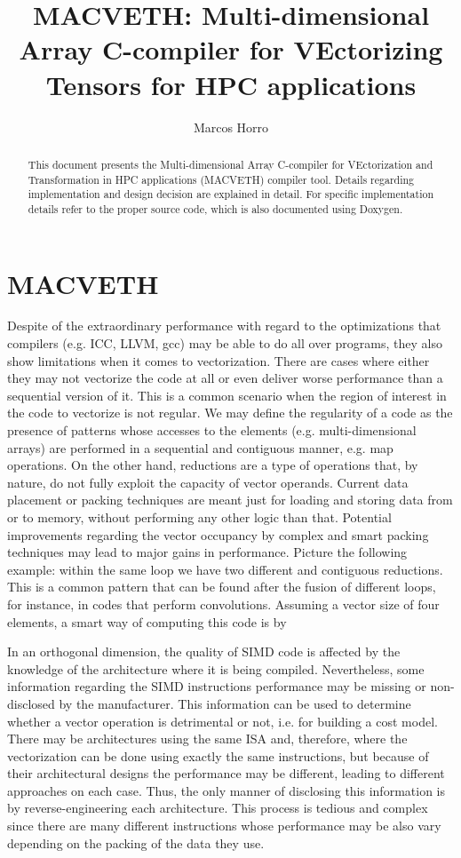 \documentclass[a4paper,12pt]{memoir}
\title{\textbf{MACVETH}: \textbf{M}ulti-dimensional \textbf{A}rray
    \textbf{C}-compiler for \textbf{VE}ctorizing
    \textbf{T}ensors for \textbf{H}PC applications}
\author{Marcos Horro}
\date{}
\begin{document}
\maketitle

\begin{abstract}
	This document presents the Multi-dimensional Array C-compiler for VEctorization
	and Transformation in HPC applications (MACVETH) compiler tool. Details
	regarding implementation and design decision are explained in detail. For
	specific implementation details refer to the proper source code, which is also
	documented using Doxygen.
\end{abstract}

\chapter{MACVETH}

Despite of the extraordinary performance with regard to the optimizations that
compilers (e.g. ICC, LLVM, gcc) may be able to do all over programs, they also
show limitations when it comes to vectorization. There are cases where either
they may not vectorize the code at all or even deliver worse performance than a
sequential version of it. This is a common scenario when the region of interest
in the code to vectorize is not regular. We may define the regularity of a code
as the presence of patterns whose accesses to the elements (e.g.
multi-dimensional arrays) are performed in a sequential and contiguous manner,
e.g. map operations. On the other hand, reductions are a type of operations
that, by nature,
do not fully exploit the capacity of vector operands. Current data placement or
packing techniques are meant just for loading and storing data from or to
memory, without performing any other logic than that. Potential improvements
regarding the vector occupancy by complex and smart packing techniques may lead
to major gains in performance. Picture the following example: within the same
loop we have two different and contiguous reductions. This is a common pattern
that can be found after the fusion of different loops, for instance, in codes
that perform convolutions. Assuming a vector size of four elements, a smart way
of computing this code is by

In an orthogonal dimension, the quality of SIMD code is affected by the knowledge of the architecture where it is being compiled. Nevertheless, some information regarding the SIMD instructions performance may be missing or non-disclosed by the manufacturer. This information can be used to determine whether a vector operation is detrimental or not, i.e. for building a cost model. There may be architectures using the same ISA and, therefore, where the vectorization can be done using exactly the same instructions, but because of their architectural designs the performance may be different, leading to different approaches on each case. Thus, the only manner of disclosing this information is by reverse-engineering each architecture. This process is tedious and complex since there are many different instructions whose performance may be also vary depending on the packing of the data they use.
\end{document}
